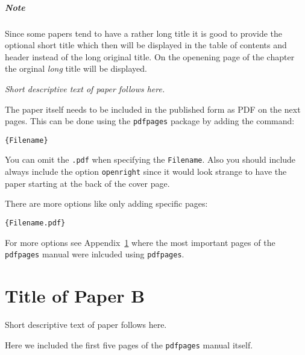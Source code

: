 \documentclass[%
oneside,    %
project,    %
nosummary   %
]{USN-MSc}
\begin{document}
\paragraph{Note}
Since some papers tend to have a rather long title it is good to provide the optional short title which then will be displayed in the table of contents and header instead of the long original title.
On the openening page of the chapter the orginal \emph{long} title will be displayed.\bigskip

\emph{Short descriptive text of paper follows here.}\bigskip

The paper itself needs to be included in the published form as PDF on the next pages.
This can be done using the \texttt{pdfpages} package by adding the command:

\begin{verbatim}
{Filename}
\end{verbatim}

You can omit the \texttt{.pdf} when specifying the \texttt{Filename}. Also you should include always include the option \texttt{openright} since it would look strange to have the paper starting at the back of the cover page.

There are more options like only adding specific pages:
\begin{verbatim}
{Filename.pdf}
\end{verbatim}

For more options see Appendix~\ref{paper-b} where the most important pages of the \texttt{pdfpages} manual were inlcuded using \texttt{pdfpages}.




\chapter[Short Title of Paper B]{Title of Paper B}
\label{paper-b}
Short descriptive text of paper follows here.

Here we included the first five pages of the \texttt{pdfpages} manual itself.


\end{document}

